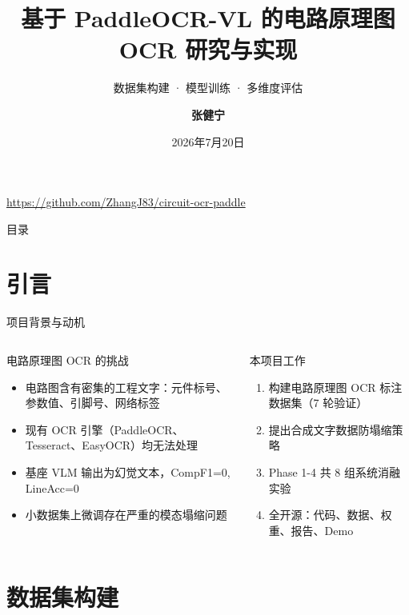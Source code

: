 \documentclass[10pt,aspectratio=169,table]{beamer}
\title[电路原理图 OCR]{基于 PaddleOCR-VL 的电路原理图 OCR 研究与实现}
\subtitle{数据集构建 · 模型训练 · 多维度评估}
\author[张健宁]{\textbf{张健宁}}
\institute[中山大学]{中山大学}
\date{2026年7月20日}
\begin{document}
\begin{frame}[plain]
  \titlepage
  \begin{center}
    \footnotesize \url{https://github.com/ZhangJ83/circuit-ocr-paddle}
  \end{center}
\end{frame}

\begin{frame}{目录}
  \tableofcontents
\end{frame}

\section{引言}

\begin{frame}{项目背景与动机}
  \begin{columns}[T]
      \begin{block}{电路原理图 OCR 的挑战}
        \footnotesize
        \begin{itemize}
          \item 电路图含有密集的工程文字：元件标号、参数值、引脚号、网络标签
          \item 现有 OCR 引擎（PaddleOCR、Tesseract、EasyOCR）均无法处理
          \item 基座 VLM 输出为幻觉文本，CompF1=0, LineAcc=0
          \item 小数据集上微调存在严重的模态塌缩问题
        \end{itemize}
      \end{block}
      \begin{block}{本项目工作}
        \footnotesize
        \begin{enumerate}
          \item 构建电路原理图 OCR 标注数据集（7 轮验证）
          \item 提出合成文字数据防塌缩策略
          \item Phase 1-4 共 8 组系统消融实验
          \item 全开源：代码、数据、权重、报告、Demo
        \end{enumerate}
      \end{block}
  \end{columns}
\end{frame}

\section{数据集构建}
\end{document}
